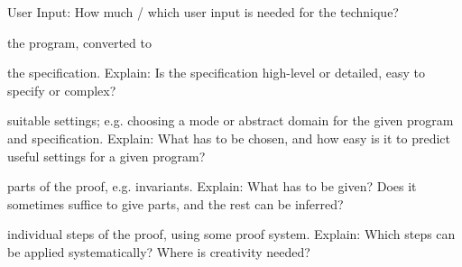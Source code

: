 \documentclass[a4paper]{article}
\begin{document}
\begin{minipage}[t]{0.16\linewidth}
\begin{betterlist}
\begin{betterlist}
		\end{betterlist}
		\item \alert{User Input:} How much / which user input is needed for the technique?
		\begin{betterlist}
			\item \checkboxChecked the program, converted to

			\item \checkboxHalfChecked the specification. Explain: Is the specification high-level or detailed, easy to specify or complex?

			\item \checkboxUnchecked suitable settings; e.g. choosing a mode or abstract domain for the given program and specification. Explain: What has to be chosen, and how easy is it to predict useful settings for a given program?

			\item \checkboxChecked parts of the proof, e.g. invariants. Explain: What has to be given? Does it sometimes suffice to give parts, and the rest can be inferred?

			\item \checkboxUnchecked individual steps of the proof, using some proof system. Explain: Which steps can be applied systematically? Where is creativity needed?


\end{betterlist}
\end{betterlist}
\end{minipage}
\end{document}

